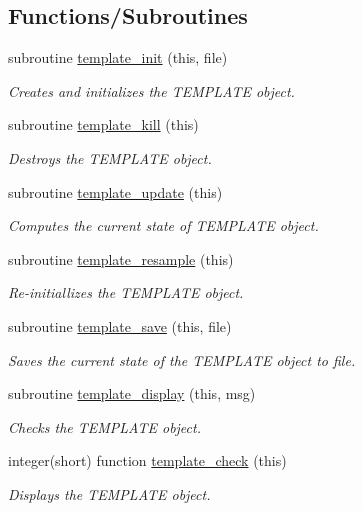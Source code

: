 \subsection*{Functions/\+Subroutines}
\begin{DoxyCompactItemize}
\item 
subroutine \hyperlink{namespacetemplate__class_afada03bed94ed0e30fc64e11fdc5d129}{template\+\_\+init} (this, file)
\begin{DoxyCompactList}\small\item\em Creates and initializes the T\+E\+M\+P\+L\+A\+TE object. \end{DoxyCompactList}\item 
subroutine \hyperlink{namespacetemplate__class_a366839a54d53b1b42596fcb6979c49e3}{template\+\_\+kill} (this)
\begin{DoxyCompactList}\small\item\em Destroys the T\+E\+M\+P\+L\+A\+TE object. \end{DoxyCompactList}\item 
subroutine \hyperlink{namespacetemplate__class_ab9e51260f15fea473f62d16c07329252}{template\+\_\+update} (this)
\begin{DoxyCompactList}\small\item\em Computes the current state of T\+E\+M\+P\+L\+A\+TE object. \end{DoxyCompactList}\item 
subroutine \hyperlink{namespacetemplate__class_ad296ef0f288e19f326fd85ec615223cf}{template\+\_\+resample} (this)
\begin{DoxyCompactList}\small\item\em Re-\/initiallizes the T\+E\+M\+P\+L\+A\+TE object. \end{DoxyCompactList}\item 
subroutine \hyperlink{namespacetemplate__class_a35aadd43e518eec1e9fab596d018441c}{template\+\_\+save} (this, file)
\begin{DoxyCompactList}\small\item\em Saves the current state of the T\+E\+M\+P\+L\+A\+TE object to file. \end{DoxyCompactList}\item 
subroutine \hyperlink{namespacetemplate__class_abce4d2dbf856d00e563f5bb628c446cd}{template\+\_\+display} (this, msg)
\begin{DoxyCompactList}\small\item\em Checks the T\+E\+M\+P\+L\+A\+TE object. \end{DoxyCompactList}\item 
integer(short) function \hyperlink{namespacetemplate__class_a61fa7b21db4be16f8d32b67df5b9463c}{template\+\_\+check} (this)
\begin{DoxyCompactList}\small\item\em Displays the T\+E\+M\+P\+L\+A\+TE object. \end{DoxyCompactList}\end{DoxyCompactItemize}


